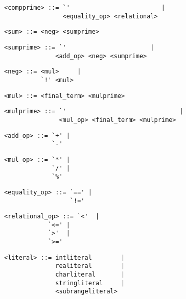 \begin{footnotesize}
\begin{lstlisting}[frame=single, label={compprime}, language=pie]
<compprime> ::= `'                         |
                <equality_op> <relational>
\end{lstlisting}

\begin{lstlisting}[frame=single, label={sum}, language=pie]
<sum> ::= <neg> <sumprime>
\end{lstlisting}

\begin{lstlisting}[frame=single, label={sumprime}, language=pie]
<sumprime> ::= `'                       |
              <add_op> <neg> <sumprime>
\end{lstlisting}

\begin{lstlisting}[frame=single, label={neg}, language=pie]
<neg> ::= <mul>     |
          `!' <mul>
\end{lstlisting}

\begin{lstlisting}[frame=single, label={mul}, language=pie]
<mul> ::= <final_term> <mulprime>
\end{lstlisting}

\begin{lstlisting}[frame=single, label={mulprime}, language=pie]
<mulprime> ::= `'                               |
               <mul_op> <final_term> <mulprime>
\end{lstlisting}

\begin{lstlisting}[frame=single, label={add_op}, language=pie]
<add_op> ::= `+' |
             `-'
\end{lstlisting}

\begin{lstlisting}[frame=single, label={mul_op}, language=pie]
<mul_op> ::= `*' |
             `/' |
             `%'
\end{lstlisting}

\begin{lstlisting}[frame=single, label={equality_op}, language=pie]
<equality_op> ::= `==' |
                  `!='
\end{lstlisting}

\begin{lstlisting}[frame=single, label={relational_op}, language=pie]
<relational_op> ::= `<'  |
	   	    `<=' |
		    `>'  |
		    `>='
\end{lstlisting}

\begin{lstlisting}[frame=single, label={literal}, language=pie]
<literal> ::= intliteral        |
              realiteral        |
              charliteral       |
              stringliteral     |
              <subrangeliteral>
\end{lstlisting}


\end{footnotesize}
